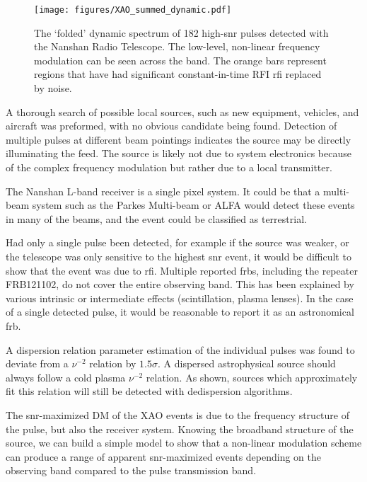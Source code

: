 \documentclass[a4paper,fleqn,usenatbib]{mnras}
\begin{document}
\begin{figure}
    \texttt{[image: figures/XAO\_summed\_dynamic.pdf]}
    \caption{The `folded' dynamic spectrum of 182 high-\gls{snr} pulses detected
    with the Nanshan Radio Telescope.  The low-level, non-linear frequency
    modulation can be seen across the band. The orange bars represent regions
    that have had significant constant-in-time RFI \gls{rfi} replaced by noise.
    }
    \label{fig:xao_summed}
\end{figure}

A thorough search of possible local sources, such as new equipment, vehicles,
and aircraft was preformed, with no obvious candidate being found. Detection of
multiple pulses at different beam pointings indicates the source may be directly
illuminating the feed. The source is likely not due to system electronics
because of the complex frequency modulation but rather due to a local
transmitter.

The Nanshan L-band receiver is a single pixel system. It could be that a
multi-beam system such as the Parkes Multi-beam or ALFA would detect these
events in many of the beams, and the event could be classified as terrestrial.

Had only a single pulse been detected, for example if the source was weaker, or
the telescope was only sensitive to the highest \gls{snr} event, it would be
difficult to show that the event was due to \gls{rfi}.  Multiple reported
\glspl{frb}, including the repeater FRB121102, do not cover the entire observing
band. This has been explained by various intrinsic or intermediate effects
(scintillation, plasma lenses). In the case of a single detected pulse, it would
be reasonable to report it as an astronomical \gls{frb}.

A dispersion relation parameter estimation of the individual pulses was found to
deviate from a $\nu^{-2}$ relation by $1.5 \sigma$. A dispersed astrophysical
source should always follow a cold plasma $\nu^{-2}$ relation. As shown, sources
which approximately fit this relation will still be detected with dedispersion
algorithms.

The \gls{snr}-maximized DM of the XAO events is due to the frequency structure
of the pulse, but also the receiver system.  Knowing the broadband structure of
the source, we can build a simple model to show that a non-linear modulation
scheme can produce a range of apparent \gls{snr}-maximized events depending on
the observing band compared to the pulse transmission band.
\end{document}
